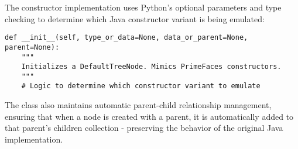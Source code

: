 \documentclass[12pt,a4paper]{article}
\begin{document}
The constructor implementation uses Python's optional parameters and type checking to determine which Java constructor variant is being emulated:

\begin{verbatim}
def __init__(self, type_or_data=None, data_or_parent=None, parent=None):
    """
    Initializes a DefaultTreeNode. Mimics PrimeFaces constructors.
    """
    # Logic to determine which constructor variant to emulate
\end{verbatim}

The class also maintains automatic parent-child relationship management, ensuring that when a node is created with a parent, it is automatically added to that parent's children collection - preserving the behavior of the original Java implementation.
\end{document}
